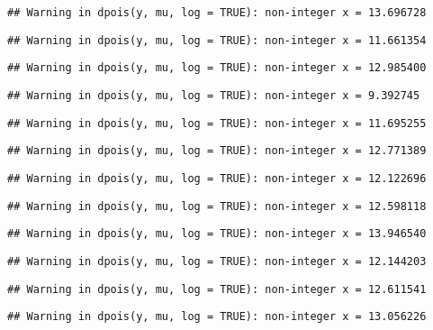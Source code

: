 \documentclass[
]{article}
\begin{document}
\begin{verbatim}
## Warning in dpois(y, mu, log = TRUE): non-integer x = 13.696728
\end{verbatim}

\begin{verbatim}
## Warning in dpois(y, mu, log = TRUE): non-integer x = 11.661354
\end{verbatim}

\begin{verbatim}
## Warning in dpois(y, mu, log = TRUE): non-integer x = 12.985400
\end{verbatim}

\begin{verbatim}
## Warning in dpois(y, mu, log = TRUE): non-integer x = 9.392745
\end{verbatim}

\begin{verbatim}
## Warning in dpois(y, mu, log = TRUE): non-integer x = 11.695255
\end{verbatim}

\begin{verbatim}
## Warning in dpois(y, mu, log = TRUE): non-integer x = 12.771389
\end{verbatim}

\begin{verbatim}
## Warning in dpois(y, mu, log = TRUE): non-integer x = 12.122696
\end{verbatim}

\begin{verbatim}
## Warning in dpois(y, mu, log = TRUE): non-integer x = 12.598118
\end{verbatim}

\begin{verbatim}
## Warning in dpois(y, mu, log = TRUE): non-integer x = 13.946540
\end{verbatim}

\begin{verbatim}
## Warning in dpois(y, mu, log = TRUE): non-integer x = 12.144203
\end{verbatim}

\begin{verbatim}
## Warning in dpois(y, mu, log = TRUE): non-integer x = 12.611541
\end{verbatim}

\begin{verbatim}
## Warning in dpois(y, mu, log = TRUE): non-integer x = 13.056226
\end{verbatim}
\end{document}
